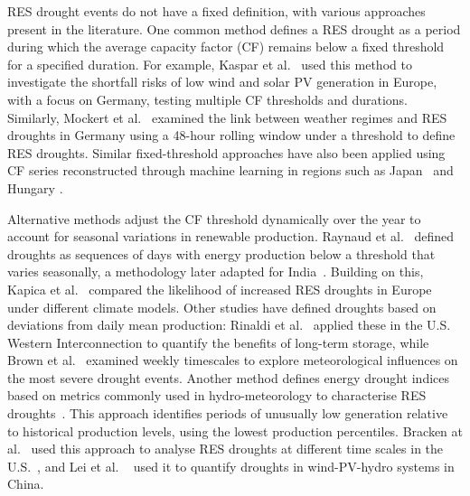 \documentclass[preprint, 12pt]{elsarticle}
\begin{document}
RES drought events do not have a fixed definition, with various approaches present in the literature. One common method defines a RES drought as a period during which the average capacity factor (CF) remains below a fixed threshold for a specified duration. For example, Kaspar et al.~\citep{kaspar2019drought} used this method to investigate the shortfall risks of low wind and solar PV generation in Europe, with a focus on Germany, testing multiple CF thresholds and durations. Similarly, Mockert et al.~\citep{mockert2023drought} examined the link between weather regimes and RES droughts in Germany using a 48-hour rolling window under a threshold to define RES droughts. Similar fixed-threshold approaches have also been applied using CF series reconstructed through machine learning in regions such as Japan~\citep{ohba2022drought} and Hungary \citep{mayer2023drought}.

Alternative methods adjust the CF threshold dynamically over the year to account for seasonal variations in renewable production. Raynaud et al.~\citep{raynaud2018drought} defined droughts as sequences of days with energy production below a threshold that varies seasonally, a methodology later adapted for India~\citep{gangopadhyay2022drought}. Building on this, Kapica et al.~\citep{kapica2024drought} compared the likelihood of increased RES droughts in Europe under different climate models. Other studies have defined droughts based on deviations from daily mean production: Rinaldi et al.~\citep{rinaldi2021drought} applied these in the U.S. Western Interconnection to quantify the benefits of long-term storage, while Brown et al.~\citep{brown2021drought} examined weekly timescales to explore meteorological influences on the most severe drought events. Another method defines energy drought indices based on metrics commonly used in hydro-meteorology to characterise RES droughts~\citep{allen2023drought}. This approach identifies periods of unusually low generation relative to historical production levels, using the lowest production percentiles. Bracken at al.~\citep{bracken2024drought} used this approach to analyse RES droughts at different time scales in the U.S.~\citep{bracken2024drought}, and Lei et al. ~\citep{lei2024drought} used it to quantify droughts in wind-PV-hydro systems in China.
\end{document}
